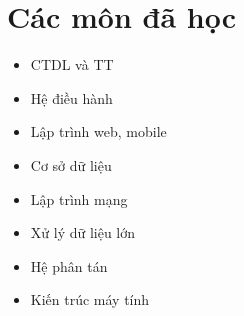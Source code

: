 \documentclass[letterpaper,11pt]{article}
\newcommand{\resumeSubHeadingListStart}{\begin{itemize}[leftmargin=0.0in, label={}]}
\newcommand{\resumeSubHeadingListEnd}{\end{itemize}}
\begin{document}
\section{Các môn đã học}
        \begin{multicols}{4}
            \begin{itemize}[itemsep=-5pt, parsep=3pt]
                \item\small CTDL và TT
                \item\small Hệ điều hành
                \item\small Lập trình web, mobile
                \item\small Cơ sở dữ liệu
                \item\small Lập trình mạng
                \item\small Xử lý dữ liệu lớn
                \item\small Hệ phân tán
                \item\small Kiến trúc máy tính
            \end{itemize}
        \end{multicols}
        \vspace*{2.0\multicolsep}
\end{document}
